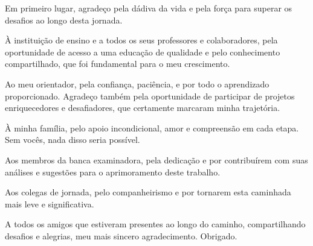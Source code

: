 \begin{agradecimentos}
	Em primeiro lugar, agradeço pela dádiva da vida e pela força para superar os desafios ao longo desta jornada.

	À instituição de ensino e a todos os seus professores e colaboradores, pela oportunidade de acesso a uma educação de qualidade e pelo conhecimento compartilhado, que foi fundamental para o meu crescimento.

	Ao meu orientador, pela confiança, paciência, e por todo o aprendizado proporcionado. Agradeço também pela oportunidade de participar de projetos enriquecedores e desafiadores, que certamente marcaram minha trajetória.

	À minha família, pelo apoio incondicional, amor e compreensão em cada etapa. Sem vocês, nada disso seria possível.

	Aos membros da banca examinadora, pela dedicação e por contribuírem com suas análises e sugestões para o aprimoramento deste trabalho.

	Aos colegas de jornada, pelo companheirismo e por tornarem esta caminhada mais leve e significativa.

	A todos os amigos que estiveram presentes ao longo do caminho, compartilhando desafios e alegrias, meu mais sincero agradecimento. Obrigado.
\end{agradecimentos}


